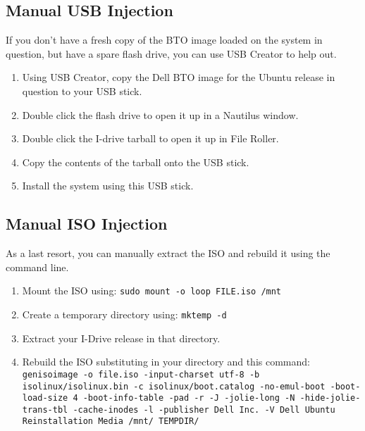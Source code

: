 \documentclass[letterpaper,10pt,titlepage]{article}
\begin{document}
\subsection{Manual USB Injection}
If you don't have a fresh copy of the BTO image loaded on the system in question, but have a spare flash drive, you can use USB Creator to help out.
\begin{enumerate}
\item Using USB Creator, copy the Dell BTO image for the Ubuntu release in question to your USB stick.
\item Double click the flash drive to open it up in a Nautilus window.
\item Double click the I-drive tarball to open it up in File Roller.
\item Copy the contents of the tarball onto the USB stick.
\item Install the system using this USB stick.
\end{enumerate}

\subsection{Manual ISO Injection}
As a last resort, you can manually extract the ISO and rebuild it using the command line.
\begin{enumerate}
\item Mount the ISO using: \texttt{sudo mount -o loop FILE.iso /mnt}
\item Create a temporary directory using: \texttt{mktemp -d}
\item Extract your I-Drive release in that directory.
\item Rebuild the ISO substituting in your directory and this command: \texttt{genisoimage -o file.iso -input-charset utf-8 -b isolinux/isolinux.bin -c isolinux/boot.catalog -no-emul-boot -boot-load-size 4 -boot-info-table -pad -r -J -jolie-long -N -hide-jolie-trans-tbl -cache-inodes -l -publisher Dell Inc. -V Dell Ubuntu Reinstallation Media /mnt/ TEMPDIR/}
\end{enumerate}
\end{document}
